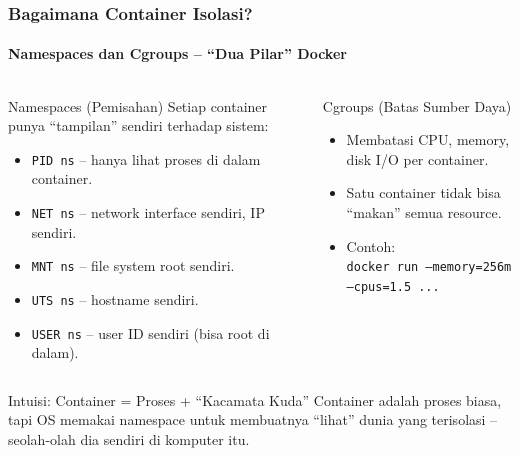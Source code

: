 \documentclass[t,aspectratio=169,xcolor=dvipsnames]{beamer}
\begin{document}
\begin{frame}[shrink=10]
    \frametitle{Bagaimana Container Isolasi?}
    \framesubtitle{Namespaces dan Cgroups -- ``Dua Pilar'' Docker}

    \begin{columns}[T]
        \begin{block}{Namespaces (Pemisahan)}
            \small
            Setiap container punya ``tampilan'' sendiri terhadap sistem:
            \begin{itemize}
                \item \texttt{PID ns} -- hanya lihat proses di dalam container.
                \item \texttt{NET ns} -- network interface sendiri, IP sendiri.
                \item \texttt{MNT ns} -- file system root sendiri.
                \item \texttt{UTS ns} -- hostname sendiri.
                \item \texttt{USER ns} -- user ID sendiri (bisa root di dalam).
            \end{itemize}
        \end{block}

        \begin{block}{Cgroups (Batas Sumber Daya)}
            \small
            \begin{itemize}
                \item Membatasi CPU, memory, disk I/O per container.
                \item Satu container tidak bisa ``makan'' semua resource.
                \item Contoh: \\
                \texttt{docker run --memory=256m --cpus=1.5 ...}
            \end{itemize}
        \end{block}
    \end{columns}

    \vspace{0.2cm}
    \begin{exampleblock}{Intuisi: Container = Proses + ``Kacamata Kuda''}
        \small
        Container adalah proses biasa, tapi OS memakai namespace untuk membuatnya ``lihat'' dunia yang terisolasi -- seolah-olah dia sendiri di komputer itu.
    \end{exampleblock}
\end{frame}
\end{document}
